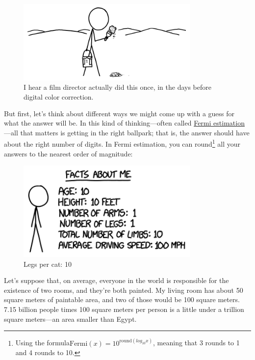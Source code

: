 {\begin{figure}[!htbp]
\centering
\includegraphics[scale=0.5, max width=0.8\textwidth]{imgs/a/84/paint_sahara.png}
\caption{I hear a film director actually did this once, in the days before digital color correction.}
\end{figure}

{But first, let's think about different ways we might come up with a guess for what the answer will be. In this kind of thinking—often called \href{http://en.wikipedia.org/wiki/Fermi\_problem}{Fermi estimation}—all that matters is getting in the right ballpark; that is, the answer should have about the right number of digits. In Fermi estimation, you can round{\footnote{Using the formula\(\text{Fermi}(x) = 10^{\text{round}(log_{10} x)}\), meaning that 3 rounds to 1 and 4 rounds to 10.} } all your answers to the nearest order of magnitude:}

\begin{figure}[!htbp]
\centering
\includegraphics[scale=0.5, max width=0.8\textwidth]{imgs/a/84/paint_age.png}
\caption{Legs per cat: 10}
\end{figure}

{Let's suppose that, on average, everyone in the world is responsible for the existence of two rooms, and they're both painted. My living room has about 50 square meters of paintable area, and two of those would be 100 square meters. 7.15 billion people times 100 square meters per person is a little under a trillion square meters—an area smaller than Egypt.}

}
